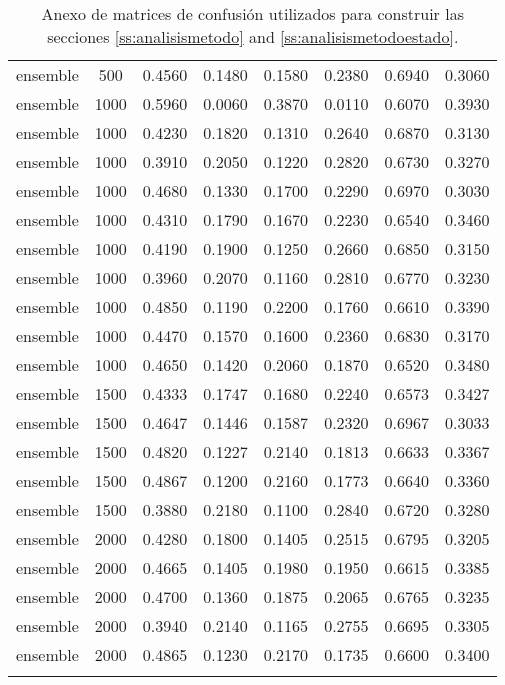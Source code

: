 \begin{scriptsize}
\begin{longtable}{cccccccc}
	ensemble & 500  & 0.4560 & 0.1480 & 0.1580 & 0.2380 & 0.6940 & 0.3060 \\
	ensemble & 1000 & 0.5960 & 0.0060 & 0.3870 & 0.0110 & 0.6070 & 0.3930 \\
	ensemble & 1000 & 0.4230 & 0.1820 & 0.1310 & 0.2640 & 0.6870 & 0.3130 \\
	ensemble & 1000 & 0.3910 & 0.2050 & 0.1220 & 0.2820 & 0.6730 & 0.3270 \\
	ensemble & 1000 & 0.4680 & 0.1330 & 0.1700 & 0.2290 & 0.6970 & 0.3030 \\
	ensemble & 1000 & 0.4310 & 0.1790 & 0.1670 & 0.2230 & 0.6540 & 0.3460 \\
	ensemble & 1000 & 0.4190 & 0.1900 & 0.1250 & 0.2660 & 0.6850 & 0.3150 \\
	ensemble & 1000 & 0.3960 & 0.2070 & 0.1160 & 0.2810 & 0.6770 & 0.3230 \\
	ensemble & 1000 & 0.4850 & 0.1190 & 0.2200 & 0.1760 & 0.6610 & 0.3390 \\
	ensemble & 1000 & 0.4470 & 0.1570 & 0.1600 & 0.2360 & 0.6830 & 0.3170 \\
	ensemble & 1000 & 0.4650 & 0.1420 & 0.2060 & 0.1870 & 0.6520 & 0.3480 \\
	ensemble & 1500 & 0.4333 & 0.1747 & 0.1680 & 0.2240 & 0.6573 & 0.3427 \\
	ensemble & 1500 & 0.4647 & 0.1446 & 0.1587 & 0.2320 & 0.6967 & 0.3033 \\
	ensemble & 1500 & 0.4820 & 0.1227 & 0.2140 & 0.1813 & 0.6633 & 0.3367 \\
	ensemble & 1500 & 0.4867 & 0.1200 & 0.2160 & 0.1773 & 0.6640 & 0.3360 \\
	ensemble & 1500 & 0.3880 & 0.2180 & 0.1100 & 0.2840 & 0.6720 & 0.3280 \\
	ensemble & 2000 & 0.4280 & 0.1800 & 0.1405 & 0.2515 & 0.6795 & 0.3205 \\
	ensemble & 2000 & 0.4665 & 0.1405 & 0.1980 & 0.1950 & 0.6615 & 0.3385 \\
	ensemble & 2000 & 0.4700 & 0.1360 & 0.1875 & 0.2065 & 0.6765 & 0.3235 \\
	ensemble & 2000 & 0.3940 & 0.2140 & 0.1165 & 0.2755 & 0.6695 & 0.3305 \\
	ensemble & 2000 & 0.4865 & 0.1230 & 0.2170 & 0.1735 & 0.6600 & 0.3400 \\
	\bottomrule
	\caption{Anexo de matrices de confusión utilizados para construir las secciones \ref{ss:analisismetodo} and \ref{ss:analisismetodoestado}.}
	\label{tab:anexo-confusion}
\end{longtable}
\end{scriptsize}

